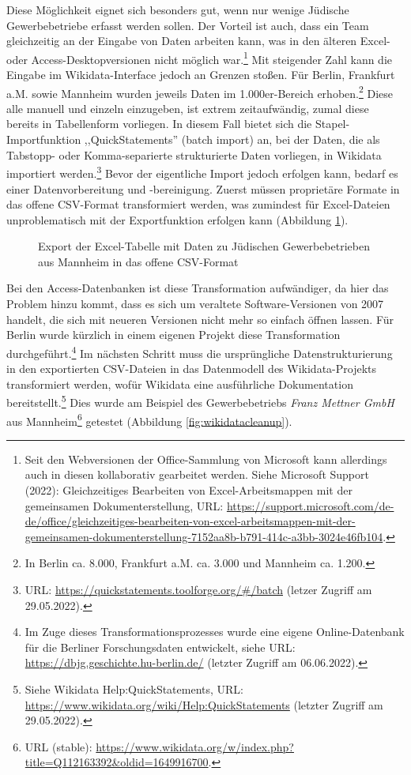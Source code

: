 Diese Möglichkeit eignet sich besonders gut, wenn nur wenige Jüdische Gewerbebetriebe erfasst werden sollen. Der Vorteil ist auch, dass ein Team gleichzeitig an der Eingabe von Daten arbeiten kann, was in den älteren Excel- oder Access-Desktopversionen nicht möglich war.\footnote{Seit den Webversionen der Office-Sammlung von Microsoft kann allerdings auch in diesen kollaborativ gearbeitet werden. Siehe Microsoft Support (2022): Gleichzeitiges Bearbeiten von Excel-Arbeitsmappen mit der gemeinsamen Dokumenterstellung, URL: \url{https://support.microsoft.com/de-de/office/gleichzeitiges-bearbeiten-von-excel-arbeitsmappen-mit-der-gemeinsamen-dokumenterstellung-7152aa8b-b791-414c-a3bb-3024e46fb104}.} Mit steigender Zahl kann die Eingabe im Wikidata-Interface jedoch an Grenzen stoßen. Für Berlin, Frankfurt a.M. sowie Mannheim wurden jeweils Daten im 1.000er-Bereich erhoben.\footnote{In Berlin ca. 8.000, Frankfurt a.M. ca. 3.000 und Mannheim ca. 1.200.} Diese alle manuell und einzeln einzugeben, ist extrem zeitaufwändig, zumal diese bereits in Tabellenform vorliegen. In diesem Fall bietet sich die Stapel-Importfunktion ,,QuickStatements'' (batch import) an, bei der Daten, die als Tabstopp- oder Komma-separierte strukturierte Daten vorliegen, in Wikidata importiert werden.\footnote{URL: \url{https://quickstatements.toolforge.org/\#/batch} (letzer Zugriff am 29.05.2022).} Bevor der eigentliche Import jedoch erfolgen kann, bedarf es einer Datenvorbereitung und -bereinigung. Zuerst müssen proprietäre Formate in das offene CSV-Format transformiert werden, was zumindest für Excel-Dateien unproblematisch mit der Exportfunktion erfolgen kann (Abbildung \ref{fig:excelcsv}).

\begin{figure}[h]
    \centering
    \caption[Export in das offene CSV-Format]{Export der Excel-Tabelle mit Daten zu Jüdischen Gewerbebetrieben aus Mannheim in das offene CSV-Format}
    \label{fig:excelcsv}
\end{figure}

Bei den Access-Datenbanken ist diese Transformation aufwändiger, da hier das Problem hinzu kommt, dass es sich um veraltete Software-Versionen von 2007 handelt, die sich mit neueren Versionen nicht mehr so einfach öffnen lassen. Für Berlin wurde kürzlich in einem eigenen Projekt diese Transformation durchgeführt.\footnote{Im Zuge dieses Transformationsprozesses wurde eine eigene Online-Datenbank für die Berliner Forschungsdaten entwickelt, siehe URL: \url{https://dbjg.geschichte.hu-berlin.de/} (letzter Zugriff am 06.06.2022).} Im nächsten Schritt muss die ursprüngliche Datenstrukturierung in den exportierten CSV-Dateien in das Datenmodell des Wikidata-Projekts transformiert werden, wofür Wikidata eine ausführliche Dokumentation bereitstellt.\footnote{Siehe Wikidata Help:QuickStatements, URL: \url{https://www.wikidata.org/wiki/Help:QuickStatements} (letzter Zugriff am 29.05.2022).} Dies wurde am Beispiel des Gewerbebetriebs \textit{Franz Mettner GmbH} aus Mannheim\footnote{URL (stable): \url{https://www.wikidata.org/w/index.php?title=Q112163392\&oldid=1649916700}.} getestet (Abbildung \ref{fig:wikidatacleanup}).

